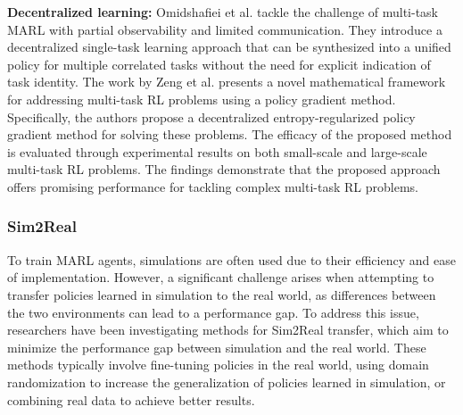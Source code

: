 \documentclass[acmsmall]{acmart}
\begin{document}
\textbf{Decentralized learning: } Omidshafiei et al. \cite{pmlr-v70-omidshafiei17a} tackle the challenge of multi-task MARL with partial observability and limited communication. They introduce a decentralized single-task learning approach that can be synthesized into a unified policy for multiple correlated tasks without the need for explicit indication of task identity.
The work by Zeng et al. \cite{pmlr-v161-zeng21a} presents a novel mathematical framework for addressing multi-task RL problems using a policy gradient method. Specifically, the authors propose a decentralized entropy-regularized policy gradient method for solving these problems. The efficacy of the proposed method is evaluated through experimental results on both small-scale and large-scale multi-task RL problems. The findings demonstrate that the proposed approach offers promising performance for tackling complex multi-task RL problems.

\subsubsection{Sim2Real} 
To train MARL agents, simulations are often used due to their efficiency and ease of implementation. However, a significant challenge arises when attempting to transfer policies learned in simulation to the real world, as differences between the two environments can lead to a performance gap.
To address this issue, researchers have been investigating methods for Sim2Real transfer, which aim to minimize the performance gap between simulation and the real world. These methods typically involve fine-tuning policies in the real world, using domain randomization to increase the generalization of policies learned in simulation, or combining real data to achieve better results.
\end{document}
